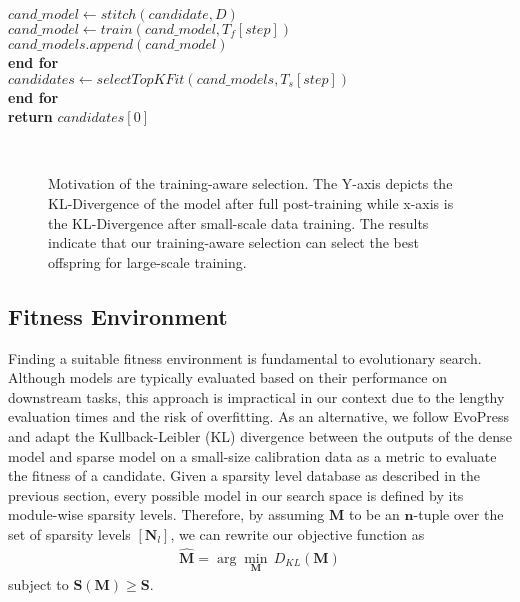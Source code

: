 \begin{algorithm}[t]
   \hspace*{3em} $cand\_model \gets stitch(candidate, D)$ \\
   \hspace*{3em} $cand\_model \gets train(cand\_model, T_f[step])$ \\
   \hspace*{3em} $cand\_models.append(cand\_model)$ \\
   \hspace*{2em} \textbf{end for}\\
 \hspace*{2em} $candidates \gets \mathit{selectTopKFit}(cand\_models, T_s[step])$ \\
\hspace*{1em}\textbf{end for}\\
\textbf{return} $candidates[0]$
\end{algorithm}
\begin{figure*}[t]
\begin{center}
\\ \vspace{-0.1in}
\end{center}
\caption{Motivation of the training-aware selection. The Y-axis depicts the KL-Divergence of the model after full post-training while x-axis is the KL-Divergence after small-scale data training. The results indicate that our training-aware selection can select the best offspring for large-scale training.}
\label{Fig_method:finetune}
\vspace{-0.05in}
\end{figure*}
\vspace{-1em}

\subsection{Fitness Environment}
\label{sec:method:fitness}
Finding a suitable fitness environment is fundamental to evolutionary search. Although models are typically evaluated based on their performance on downstream tasks, this approach is impractical in our context due to the lengthy evaluation times and the risk of overfitting. As an alternative, we follow EvoPress \cite{sieberling2024evopress} and adapt the Kullback-Leibler (KL) divergence between the outputs of the dense model and sparse model on a small-size calibration data as a metric to evaluate the fitness of a candidate. Given a sparsity level database as described in the previous section, every possible model in our search space is defined by its module-wise sparsity levels. Therefore, by assuming $\bm M$ to be an $\bm n$-tuple over the set of sparsity levels $[\bm N_{l}]$, we can rewrite our objective function as
\begin{align}
\hat{\bm M} = \arg \min_{\bm M} \, D_{KL}(\bm M)
\end{align}
subject to $\bm S(\bm M) \geq \bm S$.




